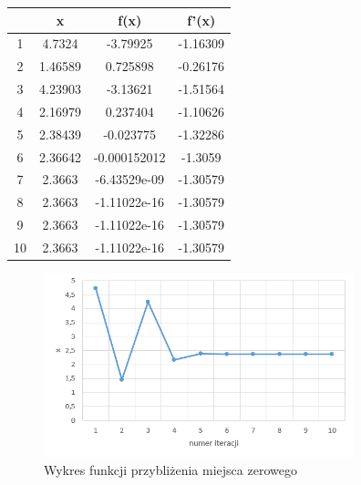 \documentclass{article}
\begin{document}
\begin{table}[H]
    \centering
    \begin{tabular}{|c|c||c||c|} \hline
     & x & f(x) & f'(x) \\ \hline
    1 & 4.7324 &  -3.79925 &  -1.16309\\ \hline
2 & 1.46589 &  0.725898  & -0.26176\\ \hline
3 & 4.23903 &  -3.13621 &  -1.51564\\ \hline
4 & 2.16979 &  0.237404  & -1.10626\\ \hline
5 & 2.38439 & -0.023775  & -1.32286\\ \hline
6 & 2.36642 & -0.000152012  &  -1.3059\\ \hline
7 & 2.3663 & -6.43529e-09 &  -1.30579\\ \hline
8 & 2.3663 & -1.11022e-16  & -1.30579\\ \hline
9 & 2.3663 & -1.11022e-16  & -1.30579\\ \hline
10 & 2.3663 & -1.11022e-16  & -1.30579\\ \hline
    \end{tabular}

    \label{tab:my_label }
\end{table}

\begin{figure}[H]
\centering
\includegraphics[width=9cm]{Nd.png}
\caption{ Wykres funkcji przybliżenia miejsca zerowego}
\label{fig:obrazek Nd}
\end{figure}

\newpage
\end{document}

